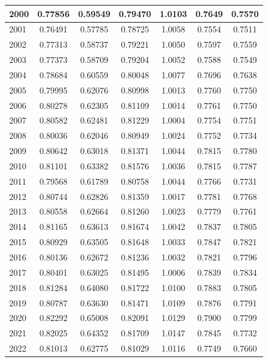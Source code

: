 \documentclass[11pt]{article}
\begin{document}
\begin{table}[htbp]
{\begin{tabular}{|l|c|c|c|c|c|c|}
2000 & 0.77856 & 0.59549 & 0.79470 & 1.0103 & 0.7649 & 0.7570\\ \hline 
2001 & 0.76491 & 0.57785 & 0.78725 & 1.0058 & 0.7554 & 0.7511\\ \hline 
2002 & 0.77313 & 0.58737 & 0.79221 & 1.0050 & 0.7597 & 0.7559\\ \hline 
2003 & 0.77373 & 0.58709 & 0.79204 & 1.0052 & 0.7588 & 0.7549\\ \hline 
2004 & 0.78684 & 0.60559 & 0.80048 & 1.0077 & 0.7696 & 0.7638\\ \hline 
2005 & 0.79995 & 0.62076 & 0.80998 & 1.0013 & 0.7760 & 0.7750\\ \hline 
2006 & 0.80278 & 0.62305 & 0.81109 & 1.0014 & 0.7761 & 0.7750\\ \hline 
2007 & 0.80582 & 0.62481 & 0.81229 & 1.0004 & 0.7754 & 0.7751\\ \hline 
2008 & 0.80036 & 0.62046 & 0.80949 & 1.0024 & 0.7752 & 0.7734\\ \hline 
2009 & 0.80642 & 0.63018 & 0.81371 & 1.0044 & 0.7815 & 0.7780\\ \hline 
2010 & 0.81101 & 0.63382 & 0.81576 & 1.0036 & 0.7815 & 0.7787\\ \hline 
2011 & 0.79568 & 0.61789 & 0.80758 & 1.0044 & 0.7766 & 0.7731\\ \hline 
2012 & 0.80744 & 0.62826 & 0.81359 & 1.0017 & 0.7781 & 0.7768\\ \hline 
2013 & 0.80558 & 0.62664 & 0.81260 & 1.0023 & 0.7779 & 0.7761\\ \hline 
2014 & 0.81165 & 0.63613 & 0.81674 & 1.0042 & 0.7837 & 0.7805\\ \hline 
2015 & 0.80929 & 0.63505 & 0.81648 & 1.0033 & 0.7847 & 0.7821\\ \hline 
2016 & 0.80136 & 0.62672 & 0.81236 & 1.0032 & 0.7821 & 0.7796\\ \hline 
2017 & 0.80401 & 0.63025 & 0.81495 & 1.0006 & 0.7839 & 0.7834\\ \hline 
2018 & 0.81284 & 0.64080 & 0.81722 & 1.0100 & 0.7883 & 0.7805\\ \hline 
2019 & 0.80787 & 0.63630 & 0.81471 & 1.0109 & 0.7876 & 0.7791\\ \hline 
2020 & 0.82292 & 0.65008 & 0.82091 & 1.0129 & 0.7900 & 0.7799\\ \hline 
2021 & 0.82025 & 0.64352 & 0.81709 & 1.0147 & 0.7845 & 0.7732\\ \hline 
2022 & 0.81013 & 0.62775 & 0.81029 & 1.0116 & 0.7749 & 0.7660\\ \hline 
\hline
\end{tabular}
}
\end{table}
\end{document}
